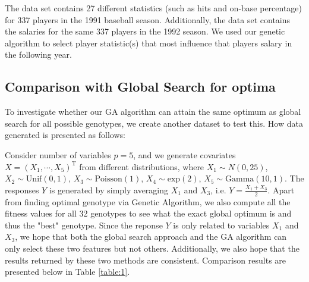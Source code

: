 \documentclass{article}
\def\T{{ \mathrm{\scriptscriptstyle T} }}
\def\T{\mathrm{\scriptstyle T}} %
\begin{document}
The data set contains 27 different statistics (such as hits and on-base percentage) for 337 players in the 1991 baseball season.  Additionally, the data set contains the salaries for the same 337 players in the 1992 season.  We used our genetic algorithm to select player statistic(s) that most influence that players salary in the following year.

\subsection{Comparison with Global Search for optima}
To investigate whether our GA algorithm can attain the same optimum as global search for all possible genotypes, we create another dataset to test this. How data generated is presented as follows:

\vspace{3mm}
\noindent
Consider number of variables $p=5$, and we generate covariates $X=(X_{1}, \cdots, X_{5})^{\T}$ from different distributions, where $X_{1}\sim N(0,25)$, $X_{2}\sim \mathrm{Unif}(0,1)$, $X_{3}\sim \mathrm{Poisson}(1)$, $X_{4}\sim \mathrm{exp}(2)$, $X_{5}\sim \mathrm{Gamma}(10,1)$. The responses $Y$ is generated by simply averaging $X_{1}$ and $X_{3}$, i.e. $Y=\frac{X_{1}+X_{3}}{2}$. Apart from finding optimal genotype via Genetic Algorithm, we also compute all the fitness values for all 32 genotypes to see what the exact global optimum is and thus the "best" genotype. Since the reponse $Y$ is only related to variables $X_{1}$ and $X_{3}$, we hope that both the global search approach and the GA algorithm can only select these two features but not others. Additionally, we also hope that the results returned by these two methods are consistent. Comparison results are presented below in Table \ref{table:1}.
\end{document}
